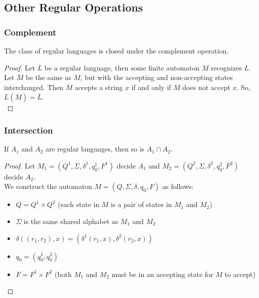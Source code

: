 \documentclass[11pt,a4paper]{article}
\begin{document}
\subsection{Other Regular Operations}
\subsubsection{Complement}
\begin{theorem}
    The class of regular languages is closed under the complement operation.

    \begin{proof}
        Let $L$ be a regular language, then some finite automaton $M$ recognizes $L$. \\

        Let $\overline{M}$ be the same as $M$, but with the accepting and non-accepting states interchanged.
        Then $\overline{M}$ accepts a string $x$ if and only if $M$ does not accept $x$. So, $L(\overline{M})=\overline{L}$. \\
    \end{proof}
\end{theorem}

\subsubsection{Intersection}
\begin{theorem}
    If $A_1$ and $A_2$ are regular languages, then so is $A_1\cap A_2$.

    \begin{proof}
        Let $M_1=(Q^1,\Sigma,\delta^1,q_0^1,F^1)$ decide $A_1$ and $M_2=(Q^2,\Sigma,\delta^2,q_0^2,F^2)$ decide $A_2$. \\

        We construct the automaton $M=(Q,\Sigma,\delta,q_0,F)$ as follows:
        \begin{itemize}
            \item $Q=Q^1\times Q^2$ (each state in $M$ is a pair of states in $M_1$ and $M_2$)
            \item $\Sigma$ is the same shared alphabet as $M_1$ and $M_2$
            \item $\delta((r_1,r_2),x)=(\delta^1(r_1,x),\delta^2(r_2,x))$
            \item $q_0=(q_0^1,q_0^2)$
            \item $F=F^1\times F^2$ (both $M_1$ and $M_2$ must be in an accepting state for $M$ to accept)
        \end{itemize}
    \end{proof}
\end{theorem}
\end{document}
